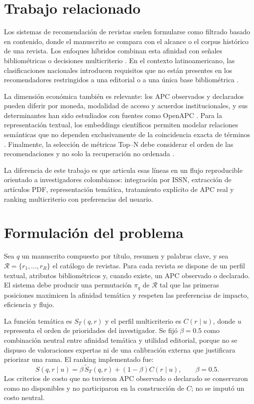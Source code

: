 \documentclass[12pt,a4paper]{article}
\begin{document}
\section{Trabajo relacionado}
Los sistemas de recomendación de revistas suelen formularse como filtrado basado en contenido, donde el manuscrito se compara con el alcance o el corpus histórico de una revista. Los enfoques híbridos combinan esta afinidad con señales bibliométricas o decisiones multicriterio \cite{abbasi2020,huynh2022,ajmal2023}. En el contexto latinoamericano, las clasificaciones nacionales introducen requisitos que no están presentes en los recomendadores restringidos a una editorial o a una única base bibliométrica \cite{vasen2017}.

La dimensión económica también es relevante: los APC observados y declarados pueden diferir por moneda, modalidad de acceso y acuerdos institucionales, y sus determinantes han sido estudiados con fuentes como OpenAPC \cite{budzinski2020}. Para la representación textual, los embeddings científicos permiten modelar relaciones semánticas que no dependen exclusivamente de la coincidencia exacta de términos \cite{thierry2023,beltagy2019}. Finalmente, la selección de métricas Top--N debe considerar el orden de las recomendaciones y no solo la recuperación no ordenada \cite{ovono2024}.

La diferencia de este trabajo es que articula esas líneas en un flujo reproducible orientado a investigadores colombianos: integración por ISSN, extracción de artículos PDF, representación temática, tratamiento explícito de APC real y ranking multicriterio con preferencias del usuario.

\section{Formulación del problema}
Sea $q$ un manuscrito compuesto por título, resumen y palabras clave, y sea $\mathcal{R}=\{r_1,\ldots,r_R\}$ el catálogo de revistas. Para cada revista se dispone de un perfil textual, atributos bibliométricos y, cuando existe, un APC observado o declarado. El sistema debe producir una permutación $\pi_q$ de $\mathcal{R}$ tal que las primeras posiciones maximicen la afinidad temática y respeten las preferencias de impacto, eficiencia y flujo.

La función temática es $S_T(q,r)$ y el perfil multicriterio es $C(r\mid u)$, donde $u$ representa el orden de prioridades del investigador. Se fijó $\beta=0.5$ como combinación neutral entre afinidad temática y utilidad editorial, porque no se dispuso de valoraciones expertas ni de una calibración externa que justificara priorizar una rama. El ranking implementado fue:
\begin{equation}
S(q,r\mid u)=\beta\,\widetilde{S}_T(q,r)+(1-\beta)C(r\mid u),\qquad \beta=0.5.
\end{equation}
Los criterios de costo que no tuvieron APC observado o declarado se conservaron como no disponibles y no participaron en la construcción de $C$; no se imputó un costo neutral.
\end{document}
